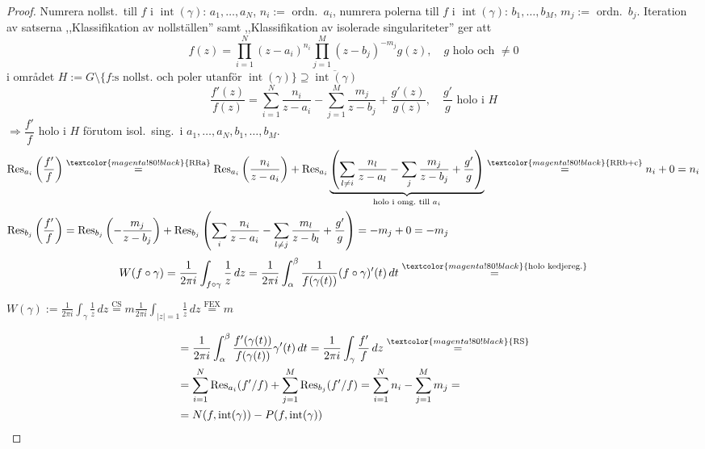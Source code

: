 \begin{proof}
Numrera nollst.\ till $f$ i $\operatorname{int}(\gamma)$: $a_1, \dots, a_N$, $n_i :=$ ordn.\ $a_i$, numrera polerna till $f$ i $\operatorname{int}(\gamma)$: $b_1, \dots, b_M$, $m_j :=$ ordn.\ $b_j$. Iteration av satserna ,,Klassifikation av nollställen'' samt ,,Klassifikation av isolerade singulariteter'' ger att
\[ f(z) = \prod_{i = 1}^N (z - a_i)^{n_i} \prod_{j = 1}^M (z - b_j)^{-m_j} g(z), \quad g \text{ holo och } \neq 0 \]
i området $H := G \setminus \{f\text{:s nollst.\ och poler utanför } \operatorname{int}(\gamma)\} \supseteq \overline{\operatorname{int}(\gamma)}$
\[ \frac{f'(z)}{f(z)} = \sum_{i = 1}^N \frac{n_i}{z - a_i} - \sum_{j = 1}^M \frac{m_j}{z - b_j} + \frac{g'(z)}{g(z)}, \quad \frac{g'}{g} \text{ holo i } H \]
$\Rightarrow \dfrac{f'}{f}$ holo i $H$ förutom isol.\ sing.\ i $a_1, \dots, a_N, b_1, \dots, b_M$.
\begin{align*}
\operatorname{Res}_{a_i}\left( \frac{f'}{f} \right) &\overset{\textcolor{magenta!80!black}{\text{RRa}}}{=} \operatorname{Res}_{a_i}\left( \frac{n_i}{z - a_i} \right) + \operatorname{Res}_{a_i}\underbrace{\left( \sum_{l \neq i} \frac{n_l}{z - a_l} - \sum_j \frac{m_j}{z - b_j} + \frac{g'}{g} \right)}_{\text{holo i omg.\ till } a_i} \overset{\textcolor{magenta!80!black}{\text{RRb+c}}}{=} n_i + 0 = n_i \\
\operatorname{Res}_{b_j}\left( \frac{f'}{f} \right) &= \operatorname{Res}_{b_j}\left( -\frac{m_j}{z - b_j} \right) + \operatorname{Res}_{b_j}\left( \sum_i \frac{n_i}{z - a_i} - \sum_{l \neq j} \frac{m_l}{z - b_l} + \frac{g'}{g} \right) = -m_j + 0 = -m_j
\end{align*}
\[ W(f \circ \gamma) = \frac{1}{2\pi i}\int_{f \circ \gamma} \frac{1}{z}\,dz = \frac{1}{2\pi i}\int_\alpha^\beta \frac{1}{f(\gamma(t))}(f \circ \gamma)'(t)\,dt \overset{\textcolor{magenta!80!black}{\text{holo kedjereg.}}}{=} \]
\begin{framed}
$\displaystyle W(\gamma) := \frac{1}{2\pi i}\int_\gamma \frac{1}{z}\,dz \overset{\text{CS}}{=} m\frac{1}{2\pi i}\int_{|z| = 1} \frac{1}{z}\,dz \overset{\text{FEX}}{=} m$
\end{framed}
\begin{align*}
&= \frac{1}{2\pi i}\int_\alpha^\beta \frac{f'(\gamma(t))}{f(\gamma(t))}\gamma'(t)\,dt = \frac{1}{2\pi i}\int_\gamma \frac{f'}{f}\,dz \overset{\textcolor{magenta!80!black}{\text{RS}}}{=} \\
&= \sum_{i = 1}^N \operatorname{Res}_{a_i}(f'/f) + \sum_{j = 1}^M \operatorname{Res}_{b_j}(f'/f) = \sum_{i = 1}^N n_i - \sum_{j = 1}^M m_j = \\
&= N(f, \operatorname{int}(\gamma)) - P(f, \operatorname{int}(\gamma))
\end{align*}
\end{proof}
